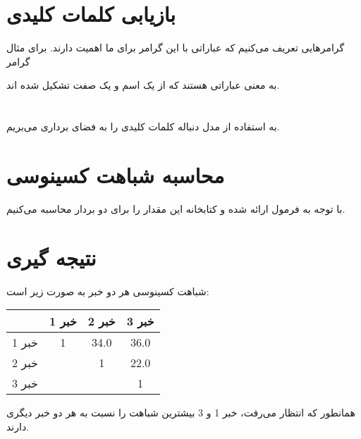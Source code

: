\documentclass{article}
\begin{document}
	\section*{بازیابی کلمات کلیدی} 
	گرامرهایی تعریف می‌کنیم که عباراتی با این گرامر برای ما اهمیت دارند. برای مثال گرامر 
	\begin{center}
	\end{center}
	به معنی عباراتی هستند که از یک اسم و یک صفت تشکیل شده اند.
	
	\section*{}
	به استفاده از مدل
	دنباله کلمات کلیدی را به فضای برداری می‌بریم.
	\section*{محاسبه شباهت کسینوسی}
	با توجه به فرمول ارائه شده و کتابخانه 
	این مقدار را برای دو بردار محاسبه می‌کنیم.
	\section*{نتیجه گیری}
	شباهت کسینوسی هر دو خبر به صورت زیر است:
	\begin{center}
		\begin{tabular}{c|ccc}
			& خبر 1 & خبر 2 & خبر 3 \\
			\hline
			خبر 1 & 1 & 34.0 & 36.0 \\
			خبر 2 &   & 1 & 22.0 \\
			خبر 3 &   &   & 1
		\end{tabular}
	\end{center}
	همانطور که انتظار می‌رفت، خبر 1 و 3 بیشترین شباهت را نسبت به هر دو خبر دیگری دارند.
	
	
	
	
	
	
	
	
	
	
	
	
	
	
	
	
	
	
	
	
	
	
	
	
	
	
\end{document}
